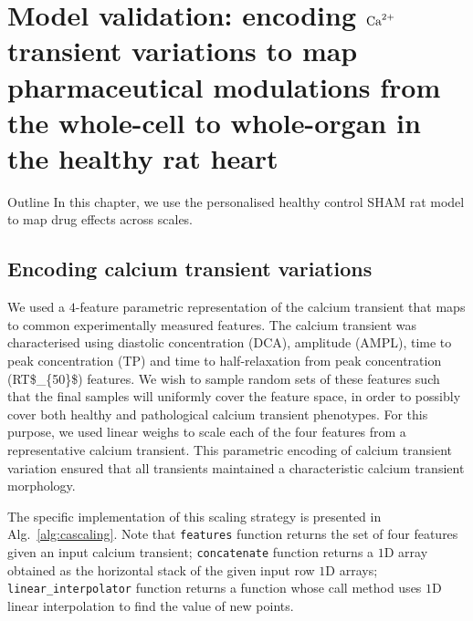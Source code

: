 \chapter{Model validation: encoding $\textrm{Ca}^{2+}$ transient variations to map pharmaceutical modulations from the whole-cell to whole-organ in the healthy rat 
heart}\label{cha:chapter6}
%
%
%
\begin{remark}{Outline}
    In this chapter, we use the personalised healthy control SHAM rat model to map drug effects across scales. 
\end{remark}


%
%
%
\section{Encoding calcium transient variations}
We used a $4$-feature parametric representation of the calcium transient that maps to common experimentally measured features. The calcium transient was characterised using diastolic concentration (\acs{DCA}), amplitude (\acs{AMPL}), time to peak concentration (\acs{TP}) and time to half-relaxation from peak concentration (\acs{RT$_{50}$}) features. We wish to sample random sets of these features such that the final samples will uniformly cover the feature space, in order to possibly cover both healthy and pathological calcium transient phenotypes. For this purpose, we used linear weighs to scale each of the four features from a representative calcium transient. This parametric encoding of calcium transient variation ensured that all transients maintained a characteristic calcium transient morphology.

\vspace{0.2cm}
The specific implementation of this scaling strategy is presented in Alg.~\ref{alg:cascaling}. Note that \texttt{features} function returns the set of four features given an input calcium transient; \texttt{concatenate} function returns a $1$D array obtained as the horizontal stack of the given input row $1$D arrays; \texttt{linear\_interpolator} function returns a function whose call method uses $1$D linear interpolation to find the value of new points.

